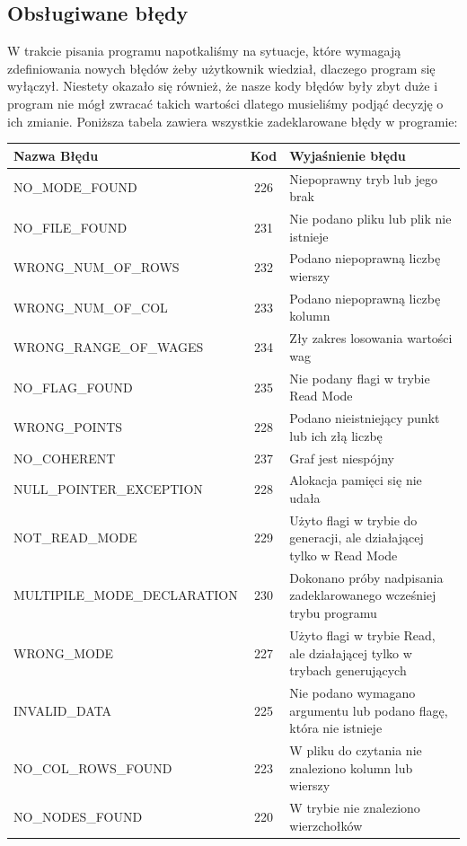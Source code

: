 \documentclass[10pt, a4paper]{report}
\begin{document}
    \subsection{Obsługiwane błędy}
    W trakcie pisania programu napotkaliśmy na sytuacje, które wymagają zdefiniowania nowych błędów żeby użytkownik wiedział, dlaczego program się wyłączył.
    Niestety okazało się również, że nasze kody błędów były zbyt duże i program nie mógł zwracać takich wartości dlatego musieliśmy podjąć decyzję o ich zmianie.
    \newline Poniższa tabela zawiera wszystkie zadeklarowane błędy w programie:
    \newline
    \begin{tabularx}{\textwidth}{ l|c|X } 
        \hline Nazwa Błędu & Kod & Wyjaśnienie błędu\\ 
        \hline NO\_MODE\_FOUND & 226 & Niepoprawny tryb lub jego brak\\ 
        \hline NO\_FILE\_FOUND & 231 & Nie podano pliku lub plik nie istnieje\\ 
        \hline WRONG\_NUM\_OF\_ROWS & 232 & Podano niepoprawną liczbę wierszy\\
        \hline WRONG\_NUM\_OF\_COL & 233 & Podano niepoprawną liczbę kolumn\\
        \hline WRONG\_RANGE\_OF\_WAGES & 234 & Zły zakres losowania wartości wag\\
        \hline NO\_FLAG\_FOUND & 235 & Nie podany flagi w trybie Read Mode\\
        \hline WRONG\_POINTS & 228 & Podano nieistniejący punkt lub ich złą liczbę\\
        \hline NO\_COHERENT & 237 & Graf jest niespójny \\
        \hline NULL\_POINTER\_EXCEPTION & 228 & Alokacja pamięci się nie udała\\
        \hline NOT\_READ\_MODE & 229 & Użyto flagi w trybie do generacji, ale działającej tylko w Read Mode\\
        \hline MULTIPILE\_MODE\_DECLARATION & 230 & Dokonano próby nadpisania zadeklarowanego wcześniej trybu programu\\
        \hline WRONG\_MODE & 227 & Użyto flagi w trybie Read, ale działającej tylko w trybach generujących\\
        \hline INVALID\_DATA & 225 & Nie podano wymagano argumentu lub podano flagę, która nie istnieje\\
        \hline NO\_COL\_ROWS\_FOUND & 223 & W pliku do czytania nie znaleziono kolumn lub wierszy\\
        \hline NO\_NODES\_FOUND & 220 & W trybie nie znaleziono wierzchołków\\
        \hline
    \end{tabularx}
\end{document}
